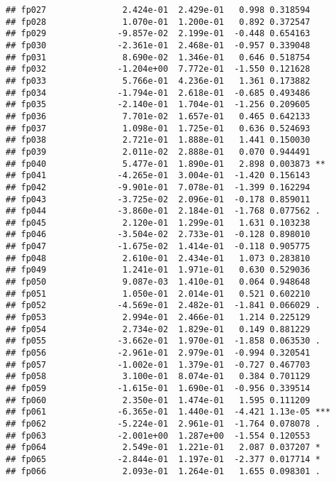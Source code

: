 \documentclass[
]{article}
\begin{document}
\begin{verbatim}
## fp027               2.424e-01  2.429e-01   0.998 0.318594    
## fp028               1.070e-01  1.200e-01   0.892 0.372547    
## fp029              -9.857e-02  2.199e-01  -0.448 0.654163    
## fp030              -2.361e-01  2.468e-01  -0.957 0.339048    
## fp031               8.690e-02  1.346e-01   0.646 0.518754    
## fp032              -1.204e+00  7.772e-01  -1.550 0.121628    
## fp033               5.766e-01  4.236e-01   1.361 0.173882    
## fp034              -1.794e-01  2.618e-01  -0.685 0.493486    
## fp035              -2.140e-01  1.704e-01  -1.256 0.209605    
## fp036               7.701e-02  1.657e-01   0.465 0.642133    
## fp037               1.098e-01  1.725e-01   0.636 0.524693    
## fp038               2.721e-01  1.888e-01   1.441 0.150030    
## fp039               2.011e-02  2.888e-01   0.070 0.944491    
## fp040               5.477e-01  1.890e-01   2.898 0.003873 ** 
## fp041              -4.265e-01  3.004e-01  -1.420 0.156143    
## fp042              -9.901e-01  7.078e-01  -1.399 0.162294    
## fp043              -3.725e-02  2.096e-01  -0.178 0.859011    
## fp044              -3.860e-01  2.184e-01  -1.768 0.077562 .  
## fp045               2.120e-01  1.299e-01   1.631 0.103238    
## fp046              -3.504e-02  2.733e-01  -0.128 0.898010    
## fp047              -1.675e-02  1.414e-01  -0.118 0.905775    
## fp048               2.610e-01  2.434e-01   1.073 0.283810    
## fp049               1.241e-01  1.971e-01   0.630 0.529036    
## fp050               9.087e-03  1.410e-01   0.064 0.948648    
## fp051               1.050e-01  2.014e-01   0.521 0.602210    
## fp052              -4.569e-01  2.482e-01  -1.841 0.066029 .  
## fp053               2.994e-01  2.466e-01   1.214 0.225129    
## fp054               2.734e-02  1.829e-01   0.149 0.881229    
## fp055              -3.662e-01  1.970e-01  -1.858 0.063530 .  
## fp056              -2.961e-01  2.979e-01  -0.994 0.320541    
## fp057              -1.002e-01  1.379e-01  -0.727 0.467703    
## fp058               3.100e-01  8.074e-01   0.384 0.701129    
## fp059              -1.615e-01  1.690e-01  -0.956 0.339514    
## fp060               2.350e-01  1.474e-01   1.595 0.111209    
## fp061              -6.365e-01  1.440e-01  -4.421 1.13e-05 ***
## fp062              -5.224e-01  2.961e-01  -1.764 0.078078 .  
## fp063              -2.001e+00  1.287e+00  -1.554 0.120553    
## fp064               2.549e-01  1.221e-01   2.087 0.037207 *  
## fp065              -2.844e-01  1.197e-01  -2.377 0.017714 *  
## fp066               2.093e-01  1.264e-01   1.655 0.098301 .  

\end{verbatim}
\end{document}
